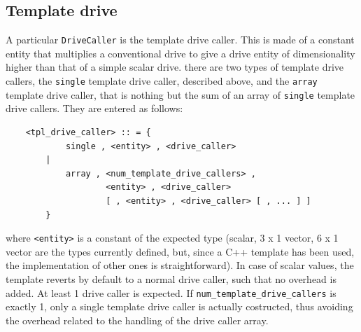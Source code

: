 \documentclass[10pt,dvips]{report}
\begin{document}
\subsection{Template drive}
A particular {\tt DriveCaller} is the template drive caller. This is made
of a constant entity that multiplies a conventional drive to give a drive
entity of dimensionality higher than that of a simple scalar drive.
there are two types of template drive callers, the {\tt single} template 
drive caller, described above, and the {\tt array} template drive caller, 
that is nothing but the sum of an array of {\tt single}
template drive callers. They are entered as follows:
\begin{verbatim}
    <tpl_drive_caller> :: = {
            single , <entity> , <drive_caller> 
        |
            array , <num_template_drive_callers> ,
                    <entity> , <drive_caller>
                    [ , <entity> , <drive_caller> [ , ... ] ]
        }
\end{verbatim}
where {\tt <entity>} is a constant of the expected type (scalar, 3 x 1 vector,
6 x 1 vector are the types currently defined, but, since a C++ template has
been used, the implementation of other ones is straightforward). In case of
scalar values, the template reverts by default to a normal drive caller,
such that no overhead is added.
At least 1 drive caller is expected. 
If {\tt num\_template\_drive\_callers} is exactly 1, only a single
template drive caller is actually costructed, thus avoiding the overhead 
related to the handling of the drive caller array.    
\end{document}
